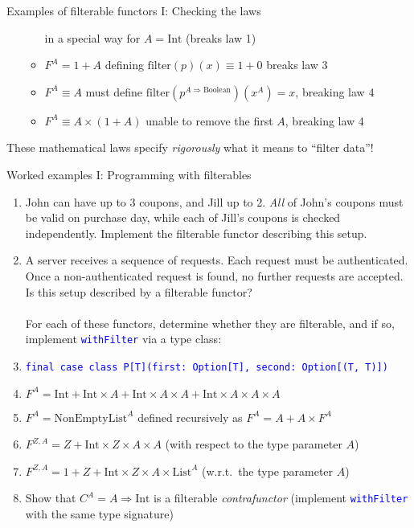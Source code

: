 \documentclass[english]{beamer}
\begin{document}
\begin{frame}{Examples of filterable functors I: Checking the laws}
\begin{itemize}
\begin{itemize}
in a special way for $A=\text{Int}$ (breaks law 1)
\item $F^{A}=1+A$ defining $\text{filter}\left(p\right)\left(x\right)\equiv1+0$
breaks law 3
\item $F^{A}\equiv A$ \textendash{} must define $\text{filter}\left(p^{A\Rightarrow\text{Boolean}}\right)\left(x^{A}\right)=x$,
breaking law 4
\item $F^{A}\equiv A\times\left(1+A\right)$ \textendash{} unable to remove
the first $A$, breaking law 4
\end{itemize}
\end{itemize}
These mathematical laws specify \emph{rigorously} what it means to
``filter data''!
\end{frame}

\begin{frame}{Worked examples I: Programming with filterables}
\begin{enumerate}
\item John can have up to 3 coupons, and Jill up to 2. \emph{All} of John's
coupons must be valid on purchase day, while each of Jill's coupons
is checked independently. Implement the filterable functor describing
this setup.
\item A server receives a sequence of requests. Each request must be authenticated.
Once a non-authenticated request is found, no further requests are
accepted. Is this setup described by a filterable functor?\\
\ \\
For each of these functors, determine whether they are filterable,
and if so, implement \texttt{\textcolor{blue}{\footnotesize{}withFilter}}
via a type class:
\item \texttt{\textcolor{blue}{\footnotesize{}final case class P{[}T{]}(first:\ Option{[}T{]},
second:\  Option{[}(T, T){]})}}{\footnotesize \par}
\item $F^{A}=\text{Int}+\text{Int}\times A+\text{Int}\times A\times A+\text{Int}\times A\times A\times A$
\item $F^{A}=\text{NonEmptyList}^{A}$ defined recursively as $F^{A}=A+A\times F^{A}$ 
\item $F^{Z,A}=Z+\text{Int}\times Z\times A\times A$ (with respect to the
type parameter $A$)
\item $F^{Z,A}=1+Z+\text{Int}\times Z\times A\times\text{List}^{A}$ (w.r.t.\ the
type parameter $A$)
\item Show that $C^{A}=A\Rightarrow\text{Int}$ is a filterable \emph{contrafunctor}
(implement \texttt{\textcolor{blue}{\footnotesize{}withFilter}} with
the same type signature)
\end{enumerate}
\end{frame}
\end{document}
